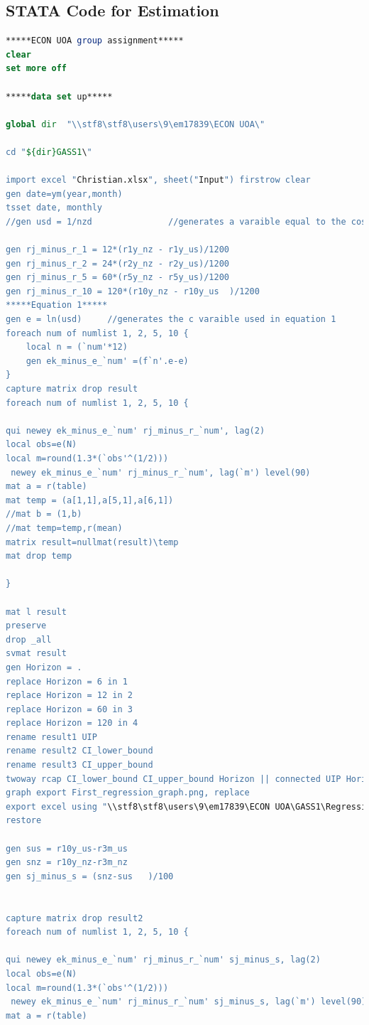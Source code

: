 \documentclass[10pt]{article}
\begin{document}
\subsection{STATA Code for Estimation}
\begin{lstlisting}[language=STATA]
*****ECON UOA group assignment*****
clear
set more off

*****data set up*****

global dir  "\\stf8\stf8\users\9\em17839\ECON UOA\"

cd "${dir}GASS1\"

import excel "Christian.xlsx", sheet("Input") firstrow clear
gen date=ym(year,month)
tsset date, monthly
//gen usd = 1/nzd				//generates a varaible equal to the cost of 1 nzd in usd

gen rj_minus_r_1 = 12*(r1y_nz - r1y_us)/1200
gen rj_minus_r_2 = 24*(r2y_nz - r2y_us)/1200
gen rj_minus_r_5 = 60*(r5y_nz - r5y_us)/1200
gen rj_minus_r_10 = 120*(r10y_nz - r10y_us	)/1200
*****Equation 1*****
gen e = ln(usd)		//generates the c varaible used in equation 1
foreach num of numlist 1, 2, 5, 10 {
	local n = (`num'*12)
	gen ek_minus_e_`num' =(f`n'.e-e)
}
capture matrix drop result
foreach num of numlist 1, 2, 5, 10 {

qui newey ek_minus_e_`num' rj_minus_r_`num', lag(2)
local obs=e(N)
local m=round(1.3*(`obs'^(1/2)))
 newey ek_minus_e_`num' rj_minus_r_`num', lag(`m') level(90)
mat a = r(table)
mat temp = (a[1,1],a[5,1],a[6,1])
//mat b = (1,b)	
//mat temp=temp,r(mean)
matrix result=nullmat(result)\temp
mat drop temp

}
	
mat l result
preserve
drop _all
svmat result
gen Horizon = .
replace Horizon = 6 in 1
replace Horizon = 12 in 2
replace Horizon = 60 in 3
replace Horizon = 120 in 4
rename result1 UIP
rename result2 CI_lower_bound
rename result3 CI_upper_bound
twoway rcap CI_lower_bound CI_upper_bound Horizon || connected UIP Horizon, ti("Figure 1: Estimated coefficients from canonical""UIP regression at different horizons")
graph export First_regression_graph.png, replace
export excel using "\\stf8\stf8\users\9\em17839\ECON UOA\GASS1\Regression.xls", replace
restore

gen sus = r10y_us-r3m_us
gen snz = r10y_nz-r3m_nz
gen sj_minus_s = (snz-sus	)/100	
	
	
capture matrix drop result2
foreach num of numlist 1, 2, 5, 10 {

qui newey ek_minus_e_`num' rj_minus_r_`num' sj_minus_s, lag(2)
local obs=e(N)
local m=round(1.3*(`obs'^(1/2)))
 newey ek_minus_e_`num' rj_minus_r_`num' sj_minus_s, lag(`m') level(90)
mat a = r(table)


\end{lstlisting}
\end{document}
